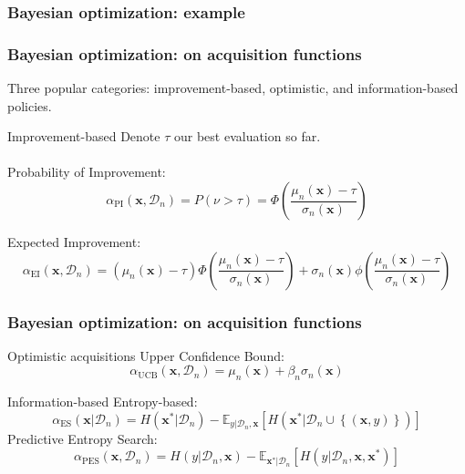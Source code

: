 \documentclass[10pt,usenames,dvipsnames]{beamer}
\begin{document}
		\begin{frame}
		\frametitle{Bayesian optimization: example}
		\centering
		\end{frame}
		
		\begin{frame}
			\frametitle{Bayesian optimization: on acquisition functions}
			Three popular categories: improvement-based, optimistic, and information-based policies.
			
			\begin{block}{Improvement-based}
				Denote $\tau$ our best evaluation so far.\\
				\phantom{we}\\
				Probability of Improvement:
				\begin{equation}
				\alpha_{\mathrm{PI}}(\boldsymbol{x}, \mathcal{D}_n) = P\left(\nu > \tau\right) = \Phi\left(\dfrac{\mu_n(\boldsymbol{x}) - \tau}{\sigma_n(\boldsymbol{x})}  \right)
				\end{equation}
				
				Expected Improvement:
				\begin{equation}
				\alpha_{\mathrm{EI}}(\boldsymbol{x}, \mathcal{D}_n) = (\mu_n(\boldsymbol{x}) - \tau)\Phi\left(\dfrac{\mu_n(\boldsymbol{x}) - \tau}{\sigma_n(\boldsymbol{x})}  \right) + \sigma_n(\boldsymbol{x})\phi\left( \dfrac{\mu_n(\boldsymbol{x}) - \tau}{\sigma_n(\boldsymbol{x})} \right)
				\end{equation}
			\end{block}
		\end{frame}	
		
		\begin{frame}
			\frametitle{Bayesian optimization: on acquisition functions}
			\begin{block}{Optimistic acquisitions}
			Upper Confidence Bound:
			\begin{equation}
			\alpha_{\mathrm{UCB}}(\boldsymbol{x}, \mathcal{D}_n) = \mu_n(\boldsymbol{x}) + \beta_n\sigma_n(\boldsymbol{x})
			\end{equation}
			\end{block}
			
			\begin{block}{Information-based}
			Entropy-based:
			\begin{equation}
			\label{acqes}
			\alpha_{\mathrm{ES}}(\boldsymbol{x}|\mathcal{D}_n) = H(\boldsymbol{x}^*|\mathcal{D}_n) - \mathbb{E}_{y|\mathcal{D}_n, \boldsymbol{x}}\left[ H(\boldsymbol{x}^*|\mathcal{D}_n \cup \left\lbrace (\boldsymbol{x}, y) \right\rbrace) \right]
			\end{equation}
			Predictive Entropy Search:
			\begin{equation}
			\alpha_{\mathrm{PES}}(\boldsymbol{x}, \mathcal{D}_n) = H(y|\mathcal{D}_n, \boldsymbol{x}) - \mathbb{E}_{\boldsymbol{x}^*|\mathcal{D}_n}\left[ H(y |\mathcal{D}_n, \boldsymbol{x}, \boldsymbol{x}^*)  \right]
			\end{equation}

			\end{block}
		\end{frame}
		
\end{document}
